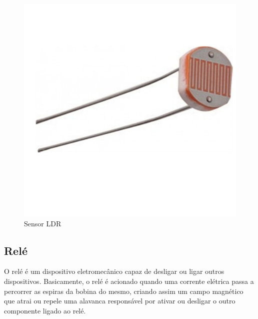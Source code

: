 \begin{figure}[H]
      \centering
      \includegraphics[scale=0.10]{figuras/Fldr.jpg}
      \caption{Sensor LDR}
      \label{fig:SLDR}
\end{figure}




\subsection{Relé}

O relé é um dispositivo eletromecânico capaz de desligar ou ligar outros dispositivos. Basicamente, o relé é acionado quando uma corrente elétrica passa a percorrer as espiras da bobina do mesmo, criando assim um campo magnético que atrai ou repele uma alavanca responsável por ativar ou desligar o outro componente ligado ao relé. 

